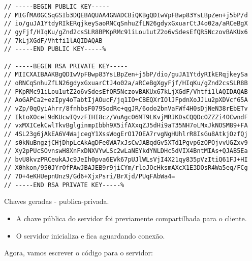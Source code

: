 \documentclass[a4paper,12pt]{article}
\begin{document}
\begin{listing}[!ht]
\begin{verbatim}
// -----BEGIN PUBLIC KEY-----
// MIGfMA0GCSqGSIb3DQEBAQUAA4GNADCBiQKBgQDIwVpFBwp83YsLBpZen+j5bP/d
// io/guJA1YtdyRIkERqjkeySaoRNCqSnhuZfLN26gdyxGxuarCtJ4o02a/aRCeBgX
// gyFjf/HIqKu/gZnd2csSLR8BPKpRMc91iLou1utZ2o6vSdesEfQR5NczovBAKUx6
// 7kLjXGdF/Vhtfi1lAQIDAQAB
// -----END PUBLIC KEY-----%                                                                                                                         

// -----BEGIN RSA PRIVATE KEY-----
// MIICXAIBAAKBgQDIwVpFBwp83YsLBpZen+j5bP/dio/guJA1YtdyRIkERqjkeySa
// oRNCqSnhuZfLN26gdyxGxuarCtJ4o02a/aRCeBgXgyFjf/HIqKu/gZnd2csSLR8B
// PKpRMc91iLou1utZ2o6vSdesEfQR5NczovBAKUx67kLjXGdF/Vhtfi1lAQIDAQAB
// AoGAPCa2+ezIpy4oTabtIjAOucF/jq1IO+CBEQXrIOlJFpdnXoJJLu2pXDVcf65A
// vZp/0qOyiAhrr/8fnhbsF079SodRc+qgJR/6odo2bnVaFWf4H0sDjNeN38rEbETv
// IktoXOcei9dKUcwIQvzFIHI8cz/VuAgcO6MT9LKvjMRJKDsCQQDcOZZZi4OCwndF
// vxMXICekCwlTkvBglginmpIbbh9X5ifAXxqZJ5dHi9aT35NH7oLMxJkNOSM89+FA
// 4SL23g6jAkEA6V4WajcegY1XssWogErO17OEA7rvgNgHUhlrR8IsGu8AtkjOzfQj
// s0kNuBngzjCHjDhpLcAkAgDFe0WA7xJsCwJABqdGv5XTd1Pgvp6zOPOjvvUGZxv9
// Xy2pPUcSOvnswH8XnFxDNXVYwLSc2wLaNEYkdYNLDHc5dVIX4BntMIAs+QJAB5Ea
// bvU8kvzPRCeukAJc9JeIh0pva6EVk67pUJlWLsVjI4X21qy835pVzItiQ61FJ+HI
// X0hkon/950JYrOfPAwJBAJEB9r9jiCYm/rloJOcHksmAXcX1E3DOsR4Wa5eq/FCg
// 7D+4eKHUepnUnz9/Gd6+XjxPsri/BrXjd/PUqFAbWa4=
// -----END RSA PRIVATE KEY-----%

\end{verbatim}
\caption{Chaves geradas - publica-privada.}
\end{listing}

\newpage
\newpage

\begin{itemize}
\item A chave p\'ublica do servidor foi previamente compartilhada para o cliente.
\item O servidor inicializa e fica aguardando conex\~ao.
\end{itemize}

Agora, vamos escrever o c\'odigo para o servidor:
\end{document}
